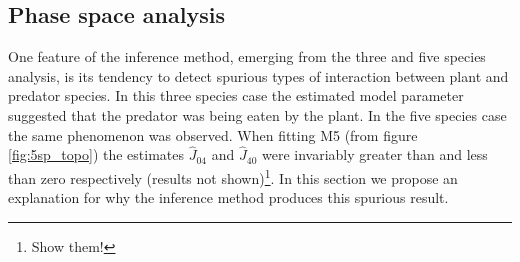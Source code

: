 %
%
%	
%	
%	
%	
%	
%	
%
%
\subsection{Phase space analysis}
\label{sec:phase_space}
%
One feature of the inference method, emerging from the three and five species analysis, is its tendency to detect spurious types of interaction between plant and predator species. In this three species case the estimated model parameter suggested that the predator was being eaten by the plant. In the five species case the same phenomenon was observed. When fitting M5 (from figure \ref{fig:5sp_topo}) the estimates $\hat{J}_{04}$  and $\hat{J}_{40}$ were invariably greater than and less than zero respectively (results not shown)\footnote{Show them!}. In this section we propose an explanation for why the inference method produces this spurious result.

